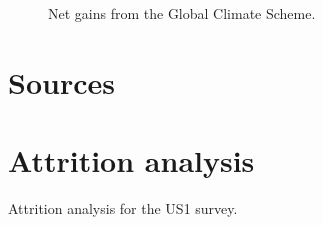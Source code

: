\begin{figure}[h!]
    \caption{Net gains from the Global Climate Scheme.}\label{fig:median_gain_2015}
\end{figure}


\clearpage
\section{Sources}\label{app:sources}



\clearpage
\section{Attrition analysis}\label{app:attrition}

\begin{table}[h]\label{tab:attrition_US1}
    \caption{Attrition analysis for the US1 survey.} 
    \makebox[\textwidth][c]{
\resizebox*{!}{.73\textheight}{ %
        
        }
    }
    {\footnotesize %
    }
\end{table}